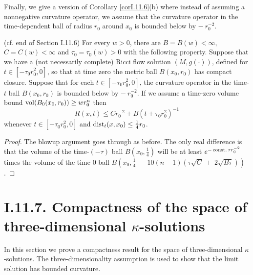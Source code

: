 Finally, we give a version of Corollary \ref{corI.11.6}(b)  where instead of assuming a
nonnegative curvature operator, we assume that the
curvature operator
in the time-dependent ball of radius $r_0$ around $x_0$ is bounded below by
$- \: r_0^{-2}$.
\begin{corollary}
  \label{cor:kl-curvature-bounds-ricci-flow-solutions-nonnegative-curvature-operator-ass-existence-curvature-operators-3}
 (cf. end of Section I.11.6)\label{I.11.6end}
For every $w > 0$, there are $B = B(w) < \infty$, $C = C(w) < \infty$ and
$\tau_0 = \tau_0(w) > 0$ with the following property.
Suppose that we have a (not necessarily complete) Ricci flow
solution $(M, g(\cdot))$, defined for $t \in [- \tau_0 r_0^2, 0]$, so that at time zero
the metric ball $B(x_0, r_0)$ has compact closure. Suppose that
for each $t \in [- \tau_0 r_0^2, 0]$, the
curvature operator in the
time-$t$ ball $B(x_0, r_0)$ is bounded below by $- \: r_0^{-2}$.
If we assume a time-zero volume bound $\operatorname{vol}(B_0(x_0, r_0))
\ge w r_0^n$ then
\begin{equation}
R(x,t) \le C r_0^{-2} + B (t + \tau_0 r_0^2)^{-1}
\end{equation}
whenever $t \in [- \tau_0 r_0^2,0]$ and $\operatorname{dist}_t(x, x_0) \le \frac14 r_0$.
\end{corollary}
\begin{proof}
The blowup argument goes through as before.
The only real difference is that the volume of the
time-$(- \tau)$ ball $B(x_0, \frac14)$ will be at least
$e^{-\operatorname{const.} \tau r_0^{-2}}$ times the volume of the
time-$0$ ball $B(x_0, \frac14 \: - \: 10(n-1)(\tau \sqrt{C} \: + \:
2 \sqrt{B \tau}))$.
\end{proof}

\section{I.11.7. Compactness of the space of three-dimensional
$\kappa$-solutions}
\label{pf11.7}

In this section we prove a compactness result for the space of three-dimensional
$\kappa$-solutions.  The three-dimensionality assumption is used to
show that
the limit solution has bounded curvature.

